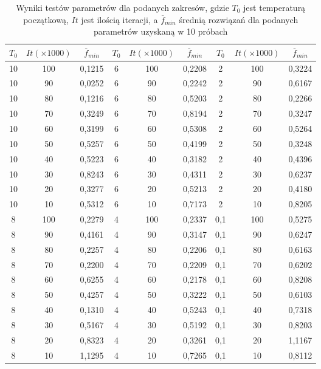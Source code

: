 \documentclass[twoside]{projektInzynierskiMS1}
\newcommand{\si}{ś}
\begin{document}
\clearpage

\begin{table}[htbp]\centering
\def\sym#1{\ifmmode^{#1}\else\(^{#1}\)\fi}
\caption{Wyniki testów parametrów dla podanych zakresów, gdzie $T_0$ jest temperaturą początkową, $It$ jest ilo\si cią iteracji, a $\overline{f}_{min}$ \si rednią rozwiązań dla podanych parametrów uzyskaną w 10 próbach}
\begin{tabular}{|c|c|c||c|c|c||c|c|c|} 
                  \hline
                   $T_0$
                  & $It (\times 1000)$
                  &$\overline{f}_{min}$ 
& $T_0$
 & $It(\times 1000)$ 
 &$\overline{f}_{min}$ 
& $T_0$
& $It (\times 1000)$
&$\overline{f}_{min}$ \\ \hline
10 & 100 & 0,1215 &6 & 100 & 0,2208& 2 & 100 & 0,3224 \\ \hline
10 & 90 & 0,0252  &6 & 90 & 0,2242& 2 & 90 & 0,6167\\ \hline
10 & 80 & 0,1216 &6 & 80 & 0,5203  & 2 & 80 & 0,2266 \\ \hline
10 & 70 & 0,3249 &6 & 70 & 0,8194 & 2 & 70 & 0,3247\\ \hline 
10 & 60 & 0,3199  &6 & 60 & 0,5308 & 2 & 60 & 0,5264\\ \hline 
10 & 50 & 0,5257  &6 & 50 & 0,4199& 2 & 50 & 0,3248\\ \hline
10 & 40 & 0,5223 &6 & 40 & 0,3182  & 2 & 40 & 0,4396\\ \hline 
10 & 30 & 0,8243 &6 & 30 & 0,4311 & 2 & 30 & 0,6237\\ \hline
10 & 20 & 0,3277  &6 & 20 & 0,5213& 2 & 20 & 0,4180\\ \hline 
10 & 10 & 0,5312  &6 & 10 & 0,7173& 2 & 10 & 0,8205\\ \Xhline{3\arrayrulewidth}

8 & 100 & 0,2279& 4 & 100 & 0,2337   & 0,1 & 100 & 0,5275 \\ \hline 
8 & 90 & 0,4161 & 4 & 90 & 0,3147  &0,1 & 90 & 0,6247 \\ \hline 
8 & 80 & 0,2257 & 4 & 80 & 0,2206 &0,1 & 80 & 0,6163 \\ \hline 
8 & 70 & 0,2200 & 4 & 70 & 0,2209 &0,1 & 70 & 0,6202 \\ \hline 
8 & 60 & 0,6255& 4 & 60 & 0,2178  & 0,1 & 60 & 0,8208 \\ \hline
8 & 50 & 0,4257 & 4 & 50 & 0,3222 & 0,1 & 50 & 0,6103 \\ \hline 
8 & 40 & 0,1310 & 4 & 40 & 0,5243 &0,1 & 40 & 0,7318\\ \hline 
8 & 30 & 0,5167 & 4 & 30 & 0,5192  &0,1 & 30 & 0,8203 \\ \hline 
8 & 20 & 0,8323 & 4 & 20 & 0,3261  & 0,1 & 20 & 1,1167 \\ \hline
8 & 10 & 1,1295 & 4 & 10 & 0,7265& 0,1 & 10 & 0,8112 \\ \hline  
\end{tabular} 
\end{table}
\end{document}
